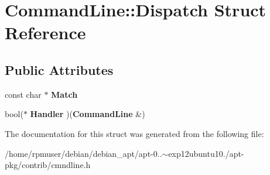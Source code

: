 \section{\-Command\-Line\-:\-:\-Dispatch \-Struct \-Reference}
\label{structCommandLine_1_1Dispatch}
\subsection*{\-Public \-Attributes}
\begin{DoxyCompactItemize}
\item 
const char $\ast$ {\bfseries \-Match}\label{structCommandLine_1_1Dispatch_a7ae1a6dba6f516b306d5ef18c4f81960}

\item 
bool($\ast$ {\bfseries \-Handler} )({\bf \-Command\-Line} \&)\label{structCommandLine_1_1Dispatch_a31f4bca978f0b9cca71b169fb6140161}

\end{DoxyCompactItemize}


\-The documentation for this struct was generated from the following file\-:\begin{DoxyCompactItemize}
\item 
/home/rpmuser/debian/debian\-\_\-apt/apt-\/0..$\sim$exp12ubuntu10./apt-\/pkg/contrib/cmndline.\-h\end{DoxyCompactItemize}
